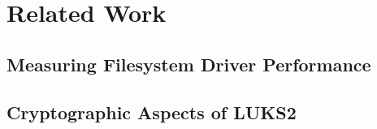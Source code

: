 \section{Related Work}
\label{chap:relatedwork}

\subsection{Measuring Filesystem Driver Performance}
\label{chap:relatedwork.fsperformance}

\subsection{Cryptographic Aspects of LUKS2}
\label{chap:relatedwork.cryptography}

